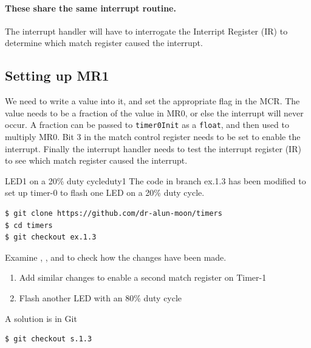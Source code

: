 \documentclass[a4paper]{tufte-handout}
\begin{document}
\paragraph{These share the same interrupt routine.}  The interrupt
handler will have to interrogate the Interript Register (IR)
\citep[24.6.1]{lpc4088} to determine which match register caused the
interrupt.

\subsection{Setting up MR1}
  We need to write a value
into it, and set the appropriate flag in the MCR.  The value needs to
be a fraction of the value in MR0, or else the interrupt will never
occur.  A fraction can be passed to \texttt{timer0Init} as a
\texttt{float}, and then used to multiply MR0.  Bit 3 in the match
control register needs to be set to enable the interrupt.  Finally the
interrupt handler needs to test the interrupt register (IR) to see
which match register caused the interrupt.

\begin{exercise}{LED1 on a 20\% duty cycle}{duty1}
The code in branch ex.1.3 has been modified to set up timer-0 to flash
one LED on a 20\% duty cycle.
\begin{verbatim}
$ git clone https://github.com/dr-alun-moon/timers
$ cd timers
$ git checkout ex.1.3
\end{verbatim}
Examine , , and  to check how
the changes have been made.

\begin{enumerate}
\item Add similar changes to enable a second match register on Timer-1
\item Flash another LED with an 80\% duty cycle
\end{enumerate}
\begin{tcolorbox}[colframe=red!50!black,title=Solution]
A solution is in Git 
\begin{verbatim}
$ git checkout s.1.3
\end{verbatim}
\end{tcolorbox}
\end{exercise}
\end{document}
